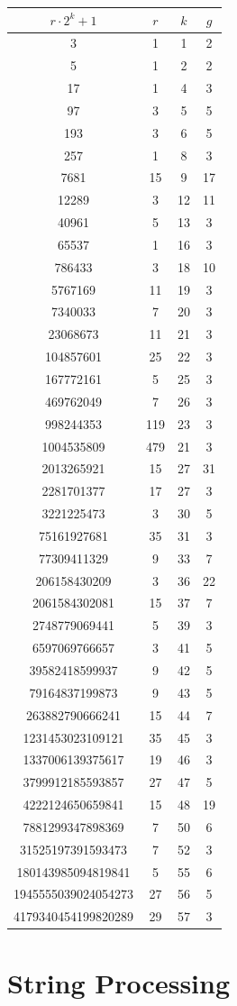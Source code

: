 \documentclass[twoside]{article}
\begin{document}
\begin{enumerate}
\begin{tabular}{cccc}
    \hline
    $r⋅2^k+1$&$r$&$k$&$g$\\
    \hline
    3&1&1&2\\
    5&1&2&2\\
    17&1&4&3\\
    97&3&5&5\\
    193&3&6&5\\
    257&1&8&3\\
    7681&15&9&17\\
    12289&3&12&11\\
    40961&5&13&3\\
    65537&1&16&3\\
    786433&3&18&10\\
    5767169&11&19&3\\
    7340033&7&20&3\\
    23068673&11&21&3\\
    104857601&25&22&3\\
    167772161&5&25&3\\
    469762049&7&26&3\\
    998244353&119&23&3\\
    1004535809&479&21&3\\
    2013265921&15&27&31\\
    2281701377&17&27&3\\
    3221225473&3&30&5\\
    75161927681&35&31&3\\
    77309411329&9&33&7\\
    206158430209&3&36&22\\
    2061584302081&15&37&7\\
    2748779069441&5&39&3\\
    6597069766657&3&41&5\\
    39582418599937&9&42&5\\
    79164837199873&9&43&5\\
    263882790666241&15&44&7\\
    1231453023109121&35&45&3\\
    1337006139375617&19&46&3\\
    3799912185593857&27&47&5\\
    4222124650659841&15&48&19\\
    7881299347898369&7&50&6\\
    31525197391593473&7&52&3\\
    180143985094819841&5&55&6\\
    1945555039024054273&27&56&5\\
    4179340454199820289&29&57&3\\
    \hline
\end{tabular}

\end{enumerate}
\clearpage\section{String Processing}
\end{document}

